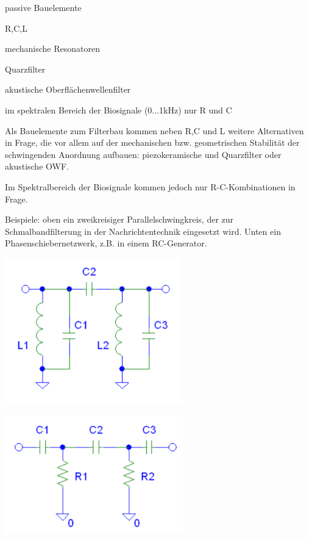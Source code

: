 \documentclass[a4paper]{article}
\begin{document}
\begin{multicols}{3}
  \begin{itemize*}
    \item passive Bauelemente
    \begin{itemize*}
      \item R,C,L
      \item mechanische Resonatoren
      \item Quarzfilter
      \item akustische Oberflächenwellenfilter
    \end{itemize*}
    \item im spektralen Bereich der Biosignale (0...1kHz) nur R und C
    \item Als Bauelemente zum Filterbau kommen neben R,C und L weitere Alternativen in Frage, die vor allem auf der mechanischen bzw. geometrischen Stabilität der schwingenden Anordnung aufbauen: piezokeramische und Quarzfilter oder akustische OWF.
    \item Im Spektralbereich der Biosignale kommen jedoch nur R-C-Kombinationen in Frage.
    \item Beispiele: oben ein zweikreisiger Parallelschwingkreis, der zur Schmalbandfilterung in der Nachrichtentechnik eingesetzt wird. Unten ein Phasenschiebernetzwerk, z.B. in einem RC-Generator.
    \begin{itemize*}
      \item \includegraphics[width=.5\linewidth]{Assets/Biosignalverarbeitung-filterentwurf.png}
      \item \includegraphics[width=.5\linewidth]{Assets/Biosignalverarbeitung-filterentwurf2.png}
    \end{itemize*}
  \end{itemize*}


\end{multicols}
\end{document}
